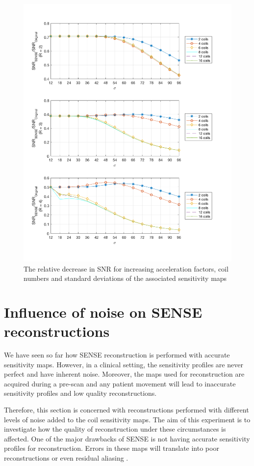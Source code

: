 \begin{figure}[H]
    \centering
    \includegraphics[width=1\textwidth,keepaspectratio]{2SNRsense}
    \caption{The relative decrease in SNR for increasing acceleration factors, coil numbers and standard deviations of the associated sensitivity maps}
    \label{fig:2SNRsense}
\end{figure}


\section{Influence of noise on SENSE reconstructions}
We have seen so far how SENSE reconstruction is performed with accurate sensitivity maps. However, in a clinical setting, the sensitivity profiles are never perfect and have inherent noise. Moreover, the maps used for reconstruction are acquired during a pre-scan and any patient movement will lead to inaccurate sensitivity profiles and low quality reconstructions. 

Therefore, this section is concerned with reconstructions performed with different levels of noise added to the coil sensitivity maps. The aim of this experiment is to investigate how the quality of reconstruction under these circumstances is affected. One of the major drawbacks of SENSE is not having accurate sensitivity profiles for reconstruction. Errors in these maps will translate into poor reconstructions or even residual aliasing \cite{Deshmane2012}. 

